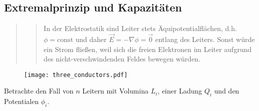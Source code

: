 \subsection{Extremalprinzip und Kapazitäten\label{ref-025}}


\begin{quote}

	\begin{quote}
		In der Elektrostatik sind Leiter stets Äquipotentialflächen, d.h. $\phi =\text{const}$ und daher $\vec {E}=-\nabla \phi =\vec {0}$ entlang des Leiters. Sonst würde ein Strom fließen, weil sich die freien Elektronen im Leiter aufgrund des nicht-verschwindenden Feldes bewegen würden.
	\end{quote}

\end{quote}


\begin{figure}[htb]
	\centering
	\texttt{[image: three\_conductors.pdf]}
	\caption{}
	\label{fig:three_conductors}
\end{figure}

Betrachte den Fall von $n$ Leitern mit Volumina $L_{i}$, einer Ladung $Q_{i}$ und den Potentialen $\phi _{i}$.

